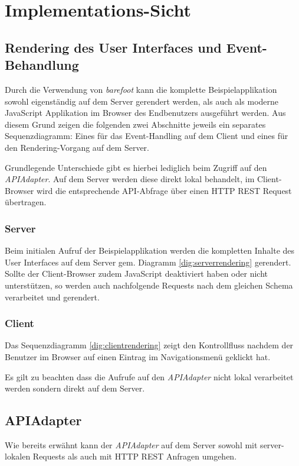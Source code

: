 \section{Implementations-Sicht}
\label{sec:sad-implementation}

\subsection{Rendering des User Interfaces und Event-Behandlung}
Durch die Verwendung von \emph{barefoot} \cite{Barefoot} kann die komplette Beispielapplikation sowohl eigenständig auf dem Server gerendert werden, als auch als moderne JavaScript Applikation im Browser des Endbenutzers ausgeführt werden. Aus diesem Grund zeigen die folgenden zwei Abschnitte jeweils ein separates Sequenzdiagramm: Eines für das Event-Handling auf dem Client und eines für den Rendering-Vorgang auf dem Server.

Grundlegende Unterschiede gibt es hierbei lediglich beim Zugriff auf den \emph{APIAdapter}. Auf dem Server werden diese direkt lokal behandelt, im Client-Browser wird die entsprechende API-Abfrage über einen HTTP \gls{REST} Request übertragen.

\subsubsection*{Server}
Beim initialen Aufruf der Beispielapplikation werden die kompletten Inhalte des User Interfaces auf dem Server gem. Diagramm \ref{dig:serverrendering} gerendert. Sollte der Client-Browser zudem JavaScript deaktiviert haben oder nicht unterstützen, so werden auch nachfolgende Requests nach dem gleichen Schema verarbeitet und gerendert.



\subsubsection*{Client}
Das Sequenzdiagramm \ref{dig:clientrendering} zeigt den Kontrollfluss nachdem der Benutzer im Browser auf einen Eintrag im Navigationsmenü geklickt hat.

Es gilt zu beachten dass die Aufrufe auf den \emph{APIAdapter} nicht lokal verarbeitet werden sondern direkt auf dem Server.




\subsection{APIAdapter}
Wie bereits erwähnt kann der \emph{APIAdapter} auf dem Server sowohl mit server-lokalen Requests als auch mit HTTP REST Anfragen umgehen.

